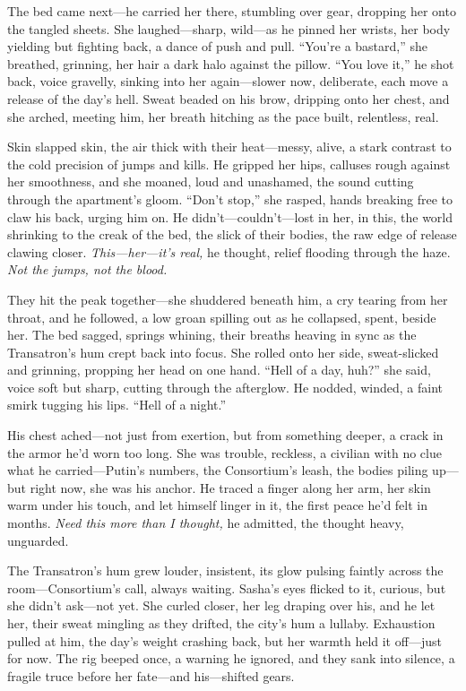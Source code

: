 \documentclass[12pt]{book}
\begin{document}
The bed came next—he carried her there, stumbling over gear, dropping her onto the tangled sheets. She laughed—sharp, wild—as he pinned her wrists, her body yielding but fighting back, a dance of push and pull. “You’re a bastard,” she breathed, grinning, her hair a dark halo against the pillow. “You love it,” he shot back, voice gravelly, sinking into her again—slower now, deliberate, each move a release of the day’s hell. Sweat beaded on his brow, dripping onto her chest, and she arched, meeting him, her breath hitching as the pace built, relentless, real.

Skin slapped skin, the air thick with their heat—messy, alive, a stark contrast to the cold precision of jumps and kills. He gripped her hips, calluses rough against her smoothness, and she moaned, loud and unashamed, the sound cutting through the apartment’s gloom. “Don’t stop,” she rasped, hands breaking free to claw his back, urging him on. He didn’t—couldn’t—lost in her, in this, the world shrinking to the creak of the bed, the slick of their bodies, the raw edge of release clawing closer. \textit{This—her—it’s real,} he thought, relief flooding through the haze. \textit{Not the jumps, not the blood.}

They hit the peak together—she shuddered beneath him, a cry tearing from her throat, and he followed, a low groan spilling out as he collapsed, spent, beside her. The bed sagged, springs whining, their breaths heaving in sync as the Transatron’s hum crept back into focus. She rolled onto her side, sweat-slicked and grinning, propping her head on one hand. “Hell of a day, huh?” she said, voice soft but sharp, cutting through the afterglow. He nodded, winded, a faint smirk tugging his lips. “Hell of a night.”

His chest ached—not just from exertion, but from something deeper, a crack in the armor he’d worn too long. She was trouble, reckless, a civilian with no clue what he carried—Putin’s numbers, the Consortium’s leash, the bodies piling up—but right now, she was his anchor. He traced a finger along her arm, her skin warm under his touch, and let himself linger in it, the first peace he’d felt in months. \textit{Need this more than I thought,} he admitted, the thought heavy, unguarded.

The Transatron’s hum grew louder, insistent, its glow pulsing faintly across the room—Consortium’s call, always waiting. Sasha’s eyes flicked to it, curious, but she didn’t ask—not yet. She curled closer, her leg draping over his, and he let her, their sweat mingling as they drifted, the city’s hum a lullaby. Exhaustion pulled at him, the day’s weight crashing back, but her warmth held it off—just for now. The rig beeped once, a warning he ignored, and they sank into silence, a fragile truce before her fate—and his—shifted gears.
\end{document}
